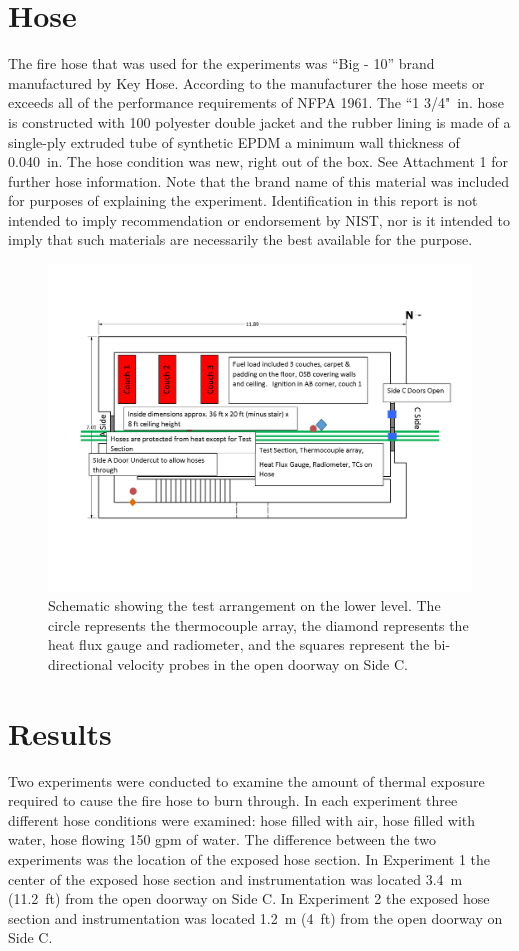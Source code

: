 \documentclass[letterpaper,11pt]{texMemo} %
\begin{document}
\section{Hose}
The fire hose that was used for the experiments was ``Big - 10'' brand manufactured by Key Hose. According to the manufacturer the hose meets or exceeds all of the performance requirements of NFPA 1961. The ``1 3/4"~in. hose is constructed with 100 polyester double jacket and the rubber lining is made of a single-ply extruded tube of synthetic EPDM a minimum wall thickness of 0.040~in. The hose condition was new, right out of the box. See Attachment 1 for further hose information. Note that the brand name of this material was included for purposes of explaining the experiment. Identification in this report is not intended to imply recommendation or endorsement by NIST, nor is it intended to imply that such materials are necessarily the best available for the purpose. 

\begin{figure}[!ht]
\centering
\includegraphics[width=.8\columnwidth]{../Figures/Hose_Figures/test_plan}
\caption{Schematic showing the test arrangement on the lower level. The circle represents the thermocouple array, the diamond represents the heat flux gauge and radiometer, and the squares represent the bi-directional velocity probes in the open doorway on Side C.}
\label{fig:test_plan}
\end{figure}

\section{Results}
Two experiments were conducted to examine the amount of thermal exposure required to cause the fire hose to burn through. In each experiment three different hose conditions were examined: hose filled with air, hose filled with water, hose flowing 150 gpm of water. The difference between the two experiments was the location of the exposed hose section. In Experiment 1 the center of the exposed hose section and instrumentation was located 3.4~m (11.2~ft) from the open doorway on Side C. In Experiment 2 the exposed hose section and instrumentation was located 1.2~m (4~ft) from the open doorway on Side C.  
\end{document}
